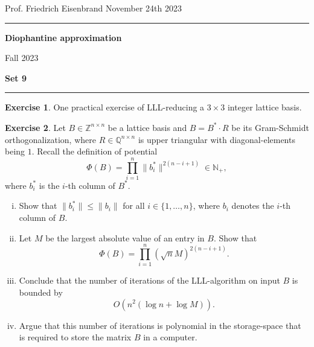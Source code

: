 \documentclass[12pt,a4paper]{article}
\date{}
\theoremstyle{plain}
\newtheorem*{Sol*}{Solution}
\theoremstyle{definition}
\newtheorem{Ex}{Exercise}
\newif\ifsolutions
\newcommand{\exercise}[2]{
			\begin{Ex} #1 \end{Ex}
			\ifsolutions  \begin{Sol*} #2 \end{Sol*} \bigskip \else \bigskip  \fi
		}
\begin{document}
\begin{center}
{Prof. Friedrich Eisenbrand \hfill November 24th 2023}
\end{center}
	
\hrule\vspace{\baselineskip}

\begin{center}
\textbf{Diophantine approximation}

Fall 2023

\bigskip

\textbf{Set 9}
\ifsolutions{\textbf{- Solutions}} \else{} \fi
\end{center}

\hrule\vspace{\baselineskip}




\exercise{
  One practical exercise of LLL-reducing a $3 ×3$ integer lattice basis. 
}
{}


\exercise{
  Let $B ∈ ℤ^{ n ×n}$ be a lattice basis and $Β= B^* ⋅ R$ be its Gram-Schmidt orthogonalization, where $R ∈ ℚ^{n ×n}$ is upper triangular with diagonal-elements being $1$. Recall the definition of potential
  \begin{displaymath}
    Φ(B) = ∏_{i=1}^n \|b_i^*\|^{2 (n-i+1)} ∈ℕ_+, 
  \end{displaymath}
  where $b_i^*$ is the $i$-th column of $B^*$. 

  \begin{enumerate}[i)]   
  \item Show that $\|b_i^* \| ≤ \|b_i\|$ for all $i ∈ \{1,\dots,n\}$, where $b_i$ denotes the $i$-th column of $B$. 
  \item Let $M$ be the largest absolute value of an entry in $B$. Show that
    \begin{displaymath}
       Φ(B) = ∏_{i=1}^n (\sqrt{n} M)^{2 (n-i+1)}. 
     \end{displaymath}
   \item Conclude that the number of iterations of the LLL-algorithm on input $B$ is bounded by
     \begin{displaymath}
       O(n^2 (\log n + \log M)).       
     \end{displaymath}
   \item Argue that this number of iterations is polynomial in the storage-space that is required to store the matrix $B$ in a computer. 
  \end{enumerate}
}{}
\end{document}
